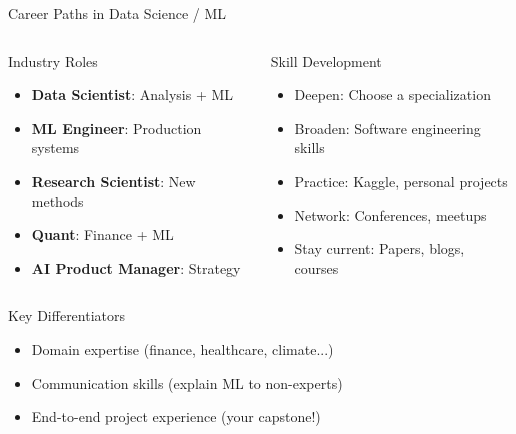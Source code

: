 \documentclass[aspectratio=169,11pt]{beamer}
\begin{document}
\begin{frame}{Career Paths in Data Science / ML}
\begin{columns}
\begin{block}{Industry Roles}
\begin{itemize}
    \item \textbf{Data Scientist}: Analysis + ML
    \item \textbf{ML Engineer}: Production systems
    \item \textbf{Research Scientist}: New methods
    \item \textbf{Quant}: Finance + ML
    \item \textbf{AI Product Manager}: Strategy
\end{itemize}
\end{block}

\begin{block}{Skill Development}
\begin{itemize}
    \item Deepen: Choose a specialization
    \item Broaden: Software engineering skills
    \item Practice: Kaggle, personal projects
    \item Network: Conferences, meetups
    \item Stay current: Papers, blogs, courses
\end{itemize}
\end{block}
\end{columns}

\vspace{1em}
\begin{alertblock}{Key Differentiators}
\begin{itemize}
    \item Domain expertise (finance, healthcare, climate...)
    \item Communication skills (explain ML to non-experts)
    \item End-to-end project experience (your capstone!)
\end{itemize}
\end{alertblock}
\end{frame}
\end{document}
